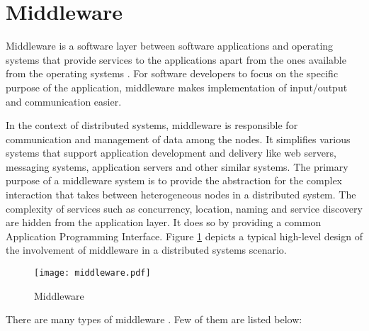 \section{Middleware}

Middleware is a software layer between software applications and operating systems that provide services to the applications apart from the ones available from the operating systems \parencite{Bernstein:1996:MMD:230798.230809}. For software developers to focus on the specific purpose of the application, middleware makes implementation of input/output and communication easier.

In the context of distributed systems, middleware is responsible for communication and management of data among the nodes. It simplifies various systems that support application development and delivery like web servers, messaging systems, application servers and other similar systems. The primary purpose of a middleware system is to provide the abstraction for the complex interaction that takes between heterogeneous nodes in a distributed system. The complexity of services such as concurrency, location, naming and service discovery are hidden from the application layer. It does so by providing a common Application Programming  Interface. Figure \ref{figures:middleware} depicts a typical high-level design of the involvement of middleware in a distributed systems scenario.

\makeatletter
\setlength{\@fptop}{0pt}
\makeatother

\begin{figure}[t!]
\centering
\def\svgwidth{.8\textwidth}
\texttt{[image: middleware.pdf]}
\caption{Middleware}\label{figures:middleware}
\end{figure}

There are many types of middleware \parencite{middleware_types}. Few of them are listed below:

